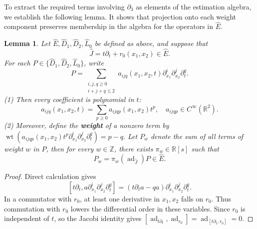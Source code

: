 \documentclass{tCON2e}
\newenvironment{revision}{\begingroup\color{black}}{\endgroup}
\numberwithin{equation}{section}
\theoremstyle{journalplain}
\newtheorem{lemma}[theorem]{Lemma}
\theoremstyle{journaldef}
\newenvironment{revision}{}{}
\begin{document}
\begin{revision}
To extract the required terms involving $\partial_3$ as elements of
the estimation algebra, we establish the following lemma. It shows
that projection onto each weight component preserves membership
in the algebra for the operators in $\widehat E$.

\begin{lemma}\label{lem:smooth-euler-module}
Let $\widehat E,\widehat D_1,\widehat D_2,\widehat L_0$
be defined as above, and suppose that
\[
\widehat J=t\partial_t+r_0(x_1,x_2)\in\widehat E.
\]
For each $P\in\{\widehat D_1,\widehat D_2,\widehat L_0\}$,
write
\[
P=
\sum_{\substack{i,j,q\ge0\\i+j+q\le2}}
a_{ijq}(x_1,x_2,t)
\partial_{x_1}^i\partial_{x_2}^j\partial_t^q.
\]
(1) Then every coefficient is polynomial in $t$:
\[
a_{ijq}(x_1,x_2,t)
=\sum_{p\ge0}a_{ijqp}(x_1,x_2)t^p,\quad
a_{ijqp}\in C^\infty(\mathbb R^2).
\]
(2) Moreover, define the \textbf{weight} of a nonzero term by
\(
\operatorname{wt}\!\left(
a_{ijqp}(x_1,x_2)t^p
\partial_{x_1}^i\partial_{x_2}^j\partial_t^q
\right)=p-q.
\)
Let $P_w$ denote the sum of all terms of weight $w$ in $P$, then for every $w\in\mathbb Z$, there exists
$\pi_w\in\mathbb R[s]$ such that
\[
P_w=\pi_w(\operatorname{ad}_{\widehat J})P
\in\widehat E.
\]
\end{lemma}

\begin{proof}
Direct calculation gives
\[
[t\partial_t,a\partial_{x_1}^i\partial_{x_2}^j\partial_t^q]
=(t\partial_ta-qa)\partial_{x_1}^i\partial_{x_2}^j\partial_t^q.
\]
In a commutator with $r_0$, at least one derivative in
$x_1,x_2$ falls on $r_0$. Thus commutation with $r_0$
lowers the differential order in these variables.
Since $r_0$ is independent of $t$, so the Jacobi
identity gives
\(
[\operatorname{ad}_{t\partial_t},\operatorname{ad}_{r_0}]
=\operatorname{ad}_{[t\partial_t,r_0]}=0.
\)


\end{proof}
\end{revision}
\end{document}
